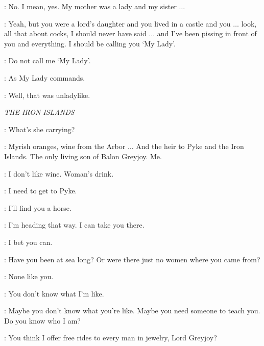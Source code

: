 \ARYA: No. I mean, yes. My mother was a lady and my sister $\ldots$

\GENDRY: Yeah, but you were a lord's daughter and you lived in a castle and you $\ldots$ look, all that about cocks, I should never have said $\ldots$ and I've been pissing in front of you and everything.  I should be calling you `My Lady'.

\ARYA: Do not call me `My Lady'.

\GENDRY: As My Lady commands.


\GENDRY: Well, that was unladylike.



\scene

\textit{THE IRON ISLANDS}


\OLDMAN: What's she carrying?

\THEON: Myrish oranges, wine from the Arbor $\ldots$ And the heir to Pyke and the Iron Islands.  The only living son of Balon Greyjoy.  Me.

\OLDMAN: I don't like wine. Woman's drink.

\THEON: I need to get to Pyke.


\OLDMAN: I'll find you a horse.


\YARA: I'm heading that way. I can take you there.

\THEON: I bet you can.

\YARA: Have you been at sea long? Or were there just no women where you came from?

\THEON: None like you.

\YARA: You don't know what I'm like.

\THEON: Maybe you don't know what you're like. Maybe you need someone to teach you. Do you know who I am?

\YARA: You think I offer free rides to every man in jewelry, Lord Greyjoy?

